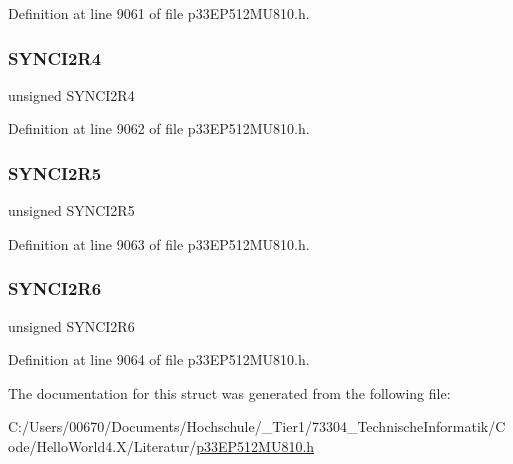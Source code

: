 Definition at line 9061 of file p33\+E\+P512\+M\+U810.\+h.

\mbox{\label{structtag_r_p_i_n_r38_b_i_t_s_a97fd1896e959eb1e14eb52ff013cffce}} 
\subsubsection{\texorpdfstring{S\+Y\+N\+C\+I2\+R4}{SYNCI2R4}}
{\footnotesize\ttfamily unsigned S\+Y\+N\+C\+I2\+R4}



Definition at line 9062 of file p33\+E\+P512\+M\+U810.\+h.

\mbox{\label{structtag_r_p_i_n_r38_b_i_t_s_a2351c0ea688194725b7106d0555412c4}} 
\subsubsection{\texorpdfstring{S\+Y\+N\+C\+I2\+R5}{SYNCI2R5}}
{\footnotesize\ttfamily unsigned S\+Y\+N\+C\+I2\+R5}



Definition at line 9063 of file p33\+E\+P512\+M\+U810.\+h.

\mbox{\label{structtag_r_p_i_n_r38_b_i_t_s_ada0ea089b5dc81ce5834952446f6a5dd}} 
\subsubsection{\texorpdfstring{S\+Y\+N\+C\+I2\+R6}{SYNCI2R6}}
{\footnotesize\ttfamily unsigned S\+Y\+N\+C\+I2\+R6}



Definition at line 9064 of file p33\+E\+P512\+M\+U810.\+h.



The documentation for this struct was generated from the following file\+:\begin{DoxyCompactItemize}
\item 
C\+:/\+Users/00670/\+Documents/\+Hochschule/\+\_\+\+Tier1/73304\+\_\+\+Technische\+Informatik/\+Code/\+Hello\+World4.\+X/\+Literatur/\hyperlink{p33_e_p512_m_u810_8h}{p33\+E\+P512\+M\+U810.\+h}\end{DoxyCompactItemize}
